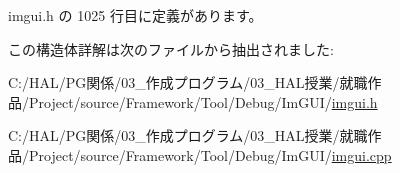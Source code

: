  imgui.\+h の 1025 行目に定義があります。



この構造体詳解は次のファイルから抽出されました\+:\begin{DoxyCompactItemize}
\item 
C\+:/\+H\+A\+L/\+P\+G関係/03\+\_\+作成プログラム/03\+\_\+\+H\+A\+L授業/就職作品/\+Project/source/\+Framework/\+Tool/\+Debug/\+Im\+G\+U\+I/\mbox{\hyperlink{imgui_8h}{imgui.\+h}}\item 
C\+:/\+H\+A\+L/\+P\+G関係/03\+\_\+作成プログラム/03\+\_\+\+H\+A\+L授業/就職作品/\+Project/source/\+Framework/\+Tool/\+Debug/\+Im\+G\+U\+I/\mbox{\hyperlink{imgui_8cpp}{imgui.\+cpp}}\end{DoxyCompactItemize}

